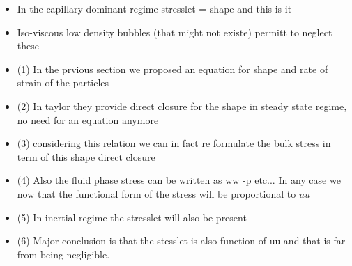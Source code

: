 \begin{itemize}
    \item In the capillary dominant regime stresslet = shape and this is it 
    \item Iso-viscous low density bubbles (that might not existe) permitt to neglect these
    \item (1) In the prvious section we proposed an equation for shape and rate of strain of the particles
    \item (2) In taylor they provide direct closure for the shape in steady state regime, no need for an equation anymore
    \item (3) considering this relation we can in fact re formulate the  bulk stress in term of this shape direct closure
    \item (4) Also the fluid phase stress can be written as ww -p etc... In any case we now that the functional form of the stress will be proportional to $u u $ 
    \item (5) In inertial regime the stresslet will also be present 
    \item (6) Major  conclusion is that the stesslet is also function of uu and that is far from being negligible. 
\end{itemize}




